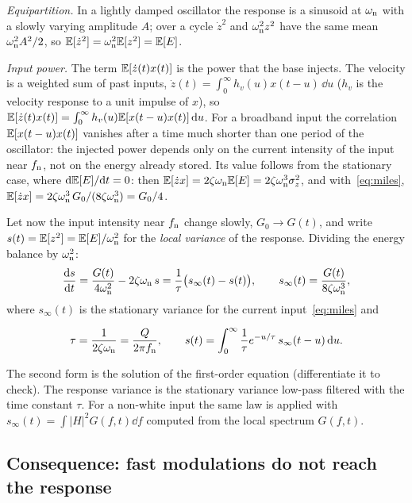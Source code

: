 \emph{Equipartition.} In a lightly damped oscillator the response is a sinusoid at $\omega_{\mathrm{n}}$ with a
slowly varying amplitude $A$; over a cycle $\dot z^2$ and $\omega_{\mathrm{n}}^2z^2$ have the same mean $\omega_{\mathrm{n}}^2A^2/2$,
so $\mathbb{E}[\dot z^2] = \omega_{\mathrm{n}}^2\mathbb{E}[z^2] = \mathbb{E}[E]$.

\emph{Input power.} The term $\mathbb{E}[\dot z(t)x(t)]$ is the power that the base injects. The velocity is a
weighted sum of past inputs, $\dot z(t) = \int_0^\infty h_v(u)x(t-u)\,\dd u$ ($h_v$ is the velocity
response to a unit impulse of $x$), so $\mathbb{E}[\dot z(t)x(t)] = \int_0^\infty
h_v(u)\mathbb{E}[x(t-u)x(t)]\,\mathrm{d} u$. For a broadband input the correlation $\mathbb{E}[x(t-u)x(t)]$ vanishes after a
time much shorter than one period of the oscillator: the injected power depends only on the current
intensity of the input near $f_{\mathrm{n}}$, not on the energy already stored. Its value follows from the
stationary case, where $\mathrm{d}\mathbb{E}[E]/\mathrm{d} t = 0$: then $\mathbb{E}[\dot zx] = 2\zeta\omega_{\mathrm{n}}\mathbb{E}[E] = 2\zeta\omega_{\mathrm{n}}^3\sigma_z^2$,
and with~\eqref{eq:miles}, $\mathbb{E}[\dot z x] = 2\zeta\omega_{\mathrm{n}}^3\,G_0/(8\zeta\omega_{\mathrm{n}}^3) = G_0/4$.

Let now the input intensity near $f_{\mathrm{n}}$ change slowly, $G_0\to G(t)$, and write $s(t) = \mathbb{E}[z^2] =
\mathbb{E}[E]/\omega_{\mathrm{n}}^2$ for the \emph{local variance} of the response. Dividing the energy balance by $\omega_{\mathrm{n}}^2$:
\begin{equation}
  \frac{\mathrm{d} s}{\mathrm{d} t} = \frac{G(t)}{4\omega_{\mathrm{n}}^2} - 2\zeta\omega_{\mathrm{n}}\, s
  = \frac{1}{\tau}\bigl(s_\infty(t) - s(t)\bigr),
  \qquad s_\infty(t) = \frac{G(t)}{8\zeta\omega_{\mathrm{n}}^3},
\end{equation}
where $s_\infty(t)$ is the stationary variance for the current input~\eqref{eq:miles} and
\begin{result}
\begin{equation}\label{eq:tau}
  \tau = \frac{1}{2\zeta\omega_{\mathrm{n}}} = \frac{Q}{2\pi f_{\mathrm{n}}},\qquad
  s(t) = \int_0^\infty \frac{1}{\tau}e^{-u/\tau}\, s_\infty(t-u)\,\mathrm{d} u .
\end{equation}
\end{result}
The second form is the solution of the first-order equation (differentiate it to check). The
response variance is the stationary variance low-pass filtered with the time constant $\tau$. For a
non-white input the same law is applied with $s_\infty(t) = \int|H|^2G(f,t)\dd f$ computed from the
local spectrum $G(f,t)$.

\subsection{Consequence: fast modulations do not reach the response}\label{sec:papoulis}

